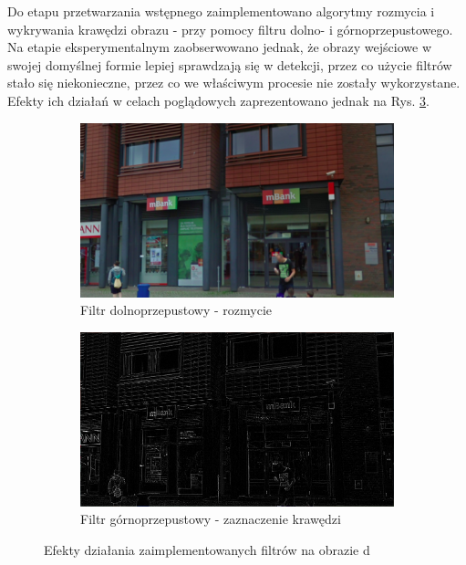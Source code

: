 Do etapu przetwarzania wstępnego zaimplementowano algorytmy rozmycia i wykrywania krawędzi obrazu - przy pomocy filtru dolno- i górnoprzepustowego. Na etapie eksperymentalnym zaobserwowano jednak, że obrazy wejściowe w swojej domyślnej formie lepiej sprawdzają się w detekcji, przez co użycie filtrów stało się niekonieczne, przez co we właściwym procesie nie zostały wykorzystane. Efekty ich działań w celach poglądowych zaprezentowano jednak na Rys. \ref{fig:filtry}.

\begin{figure}[H]
\begin{subfigure}{.5\textwidth}
  \centering
  \includegraphics[width=.8\linewidth]{figures/img_blurred.png}
  \caption{Filtr dolnoprzepustowy - rozmycie}
  \label{fig:sfig1}
\end{subfigure}%
\begin{subfigure}{.5\textwidth}
  \centering
  \includegraphics[width=.8\linewidth]{figures/img_sharpened.png}
  \caption{Filtr górnoprzepustowy - zaznaczenie krawędzi}
  \label{fig:sfig2}
\end{subfigure}
\caption{Efekty działania zaimplementowanych filtrów na obrazie d}
\label{fig:filtry}
\end{figure}